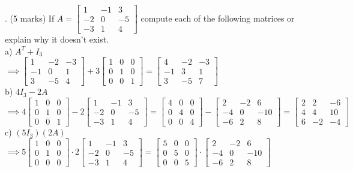 \documentclass[a4paper]{article}
\begin{document}
. (5 marks) If $A = \begin{bmatrix}
1&-1&3\\
-2&0&-5\\
-3&1&4
\end{bmatrix}$ compute each of the following matrices or explain why it doesn't exist.\\
a) $A^T + I_3$\\
$\implies\begin{bmatrix}
1&-2&-3\\
-1&0&1\\
3&-5&4
\end{bmatrix} + 3\begin{bmatrix}
1&0&0\\
0&1&0\\
0&0&1
\end{bmatrix} = \begin{bmatrix}
4&-2&-3\\
-1&3&1\\
3&-5&7
\end{bmatrix}$\\
b) $4I_3 - 2A$\\
$\implies 4\begin{bmatrix}
1&0&0\\
0&1&0\\
0&0&1
\end{bmatrix} - 2\begin{bmatrix}
1&-1&3\\
-2&0&-5\\
-3&1&4
\end{bmatrix} = \begin{bmatrix}
4&0&0\\
0&4&0\\
0&0&4
\end{bmatrix} - \begin{bmatrix}
2&-2&6\\
-4&0&-10\\
-6&2&8
\end{bmatrix} = \begin{bmatrix}
2&2&-6\\
4&4&10\\
6&-2&-4
\end{bmatrix}$\\
c) $(5I_3)(2A)$\\
$\implies 5\begin{bmatrix}
1&0&0\\
0&1&0\\
0&0&0
\end{bmatrix} \cdot 2\begin{bmatrix}
1&-1&3\\
-2&0&-5\\
-3&1&4
\end{bmatrix} = \begin{bmatrix}
5&0&0\\
0&5&0\\
0&0&5
\end{bmatrix} \cdot \begin{bmatrix}
2&-2&6\\
-4&0&-10\\
-6&2&8
\end{bmatrix}$\\
\end{document}
